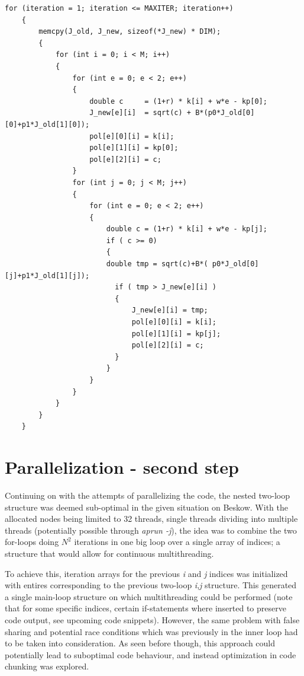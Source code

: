 \documentclass[12pt]{article}
\begin{document}
\begin{lstlisting}[caption={Restructured for-loops, created for simpler parallelization}, label={lst:L4}]
 for (iteration = 1; iteration <= MAXITER; iteration++)
    {
        memcpy(J_old, J_new, sizeof(*J_new) * DIM);
        {   
            for (int i = 0; i < M; i++)
            {
                for (int e = 0; e < 2; e++)
                { 
                    double c     = (1+r) * k[i] + w*e - kp[0];
                    J_new[e][i]  = sqrt(c) + B*(p0*J_old[0][0]+p1*J_old[1][0]);
                    pol[e][0][i] = k[i];
                    pol[e][1][i] = kp[0];
                    pol[e][2][i] = c;               
                }
                for (int j = 0; j < M; j++)
                {
                    for (int e = 0; e < 2; e++)
                    {
                        double c = (1+r) * k[i] + w*e - kp[j];
                        if ( c >= 0)
                        {
                        double tmp = sqrt(c)+B*( p0*J_old[0][j]+p1*J_old[1][j]);
                          if ( tmp > J_new[e][i] )
                          {
                              J_new[e][i] = tmp;
                              pol[e][0][i] = k[i];
                              pol[e][1][i] = kp[j];
                              pol[e][2][i] = c;
                          }
                        }
                    }
                }
            }
        }
    }
\end{lstlisting}
\section*{Parallelization - second step}
Continuing on with the attempts of parallelizing the code, the nested two-loop structure was deemed sub-optimal in the given situation on Beskow. With the allocated nodes being limited to 32 threads, single threads dividing into multiple threads (potentially possible through \emph{aprun -j}), the idea was to combine the two for-loops doing $N^2$ iterations in one big loop over a single array of indices; a structure that would allow for continuous multithreading. 

To achieve this, iteration arrays for the previous \emph{i} and \emph{j} indices was initialized with entires corresponding to the previous two-loop \emph{i},\emph{j} structure. This generated a single main-loop structure on which multithreading could be performed (note that for some specific indices, certain if-statements where inserted to preserve code output, see upcoming code snippets). However, the same problem with false sharing and potential race conditions which was previously in the inner loop had to be taken into consideration. As seen before though, this approach could potentially lead to suboptimal code behaviour, and instead optimization in code chunking was explored.
\end{document}
